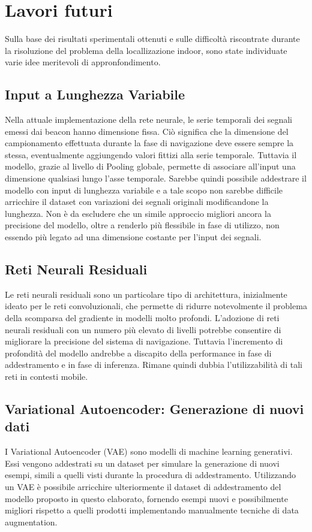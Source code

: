 \section{Lavori futuri}
Sulla base dei risultati sperimentali ottenuti e sulle difficoltà riscontrate
durante la risoluzione del problema della locallizazione indoor, sono state
individuate varie idee meritevoli di appronfondimento.
\subsection{Input a Lunghezza Variabile}
Nella attuale implementazione della rete neurale, le serie temporali dei
segnali emessi dai beacon hanno dimensione fissa. Ciò significa che la
dimensione del campionamento effettuata durante la fase di navigazione deve
essere sempre la stessa, eventualmente aggiungendo valori fittizi alla serie
temporale. Tuttavia il modello, grazie al livello di Pooling globale, permette
di associare all'input una dimensione qualsiasi lungo l'asse temporale. Sarebbe
quindi possibile addestrare il modello con input di lunghezza variabile e a
tale scopo non sarebbe difficile arricchire il dataset con variazioni dei
segnali originali modificandone la lunghezza. Non è da escludere che un simile
approccio migliori ancora la precisione del modello, oltre a renderlo più
flessibile in fase di utilizzo, non essendo più legato ad una dimensione
costante per l'input dei segnali.
\subsection{Reti Neurali Residuali}
Le reti neurali residuali sono un particolare tipo di architettura,
inizialmente ideato per le reti convoluzionali, che permette di ridurre
notevolmente il problema della scomparsa del gradiente in modelli molto
profondi\cite{resnet}. L'adozione di reti neurali residuali con un numero più
elevato di livelli potrebbe consentire di migliorare la precisione del sistema
di navigazione. Tuttavia l'incremento di profondità del modello andrebbe a
discapito della performance in fase di addestramento e in fase di inferenza.
Rimane quindi dubbia l'utilizzabilità di tali reti in contesti mobile.
\subsection{Variational Autoencoder: Generazione di nuovi dati}
I Variational Autoencoder (VAE) sono modelli di machine learning generativi.
Essi vengono addestrati su un dataset per simulare la generazione di nuovi
esempi, simili a quelli visti durante la procedura di addestramento\cite{vae}.
Utilizzando un VAE è possibile arricchire ulteriormente il dataset di
addestramento del modello proposto in questo elaborato, fornendo esempi nuovi e
possibilmente migliori rispetto a quelli prodotti implementando manualmente
tecniche di data augmentation.
